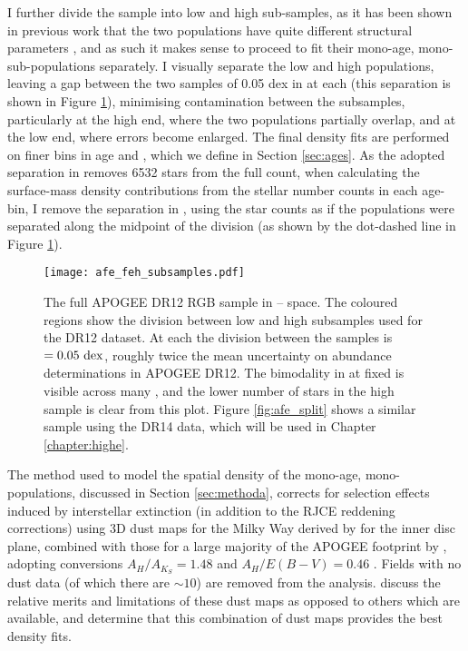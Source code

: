 I further divide the sample into low and high \afe{} sub-samples, as it has been shown in previous work that the two populations have quite different structural parameters \citep{2016ApJ...823...30B}, and as such it makes sense to proceed to fit their mono-age, mono-\feh{} sub-populations separately. I visually separate the low and high \afe{} populations, leaving a gap between the two samples of 0.05 dex in \afe{} at each \feh{} (this separation is shown in Figure \ref{fig:afe_feh}), minimising contamination between the subsamples, particularly at the high \feh{} end, where the two populations partially overlap, and at the low \feh{} end, where \afe{} errors become enlarged. The final density fits are performed on finer bins in age and \feh{}, which we define in Section \ref{sec:ages}. As the adopted separation in \afe{} removes 6532 stars from the full count, when calculating the surface-mass density contributions from the stellar number counts in each age-\feh{} bin, I remove the separation in \afe{}, using the star counts as if the populations were separated along the midpoint of the division (as shown by the dot-dashed line in Figure \ref{fig:afe_feh}). 

 \begin{figure}
  \centering
 	\texttt{[image: afe\_feh\_subsamples.pdf]}
    \caption[\afe{}--\feh{} for the APOGEE DR12 sample, demonstrating the division used to divide between high and low \afe{} populations in Chapter \ref{chapter:apogeestruc}]{The full APOGEE DR12 RGB sample in \afe{}--\feh{} space. The coloured regions show the division between low and high \afe{} subsamples used for the DR12 dataset. At each \feh{} the division between the samples is \afe{} $= 0.05 \ \rm{dex}$, roughly twice the mean uncertainty on \afe{} abundance determinations in APOGEE DR12. The bimodality in \afe{} at fixed \feh{} is visible across many \feh{}, and the lower number of stars in the high \afe{} sample is clear from this plot. Figure \ref{fig:afe_split} shows a similar sample using the DR14 data, which will be used in Chapter \ref{chapter:highe}.}
 \label{fig:afe_feh}
\end{figure}


The method used to model the spatial density of the mono-age, mono-\feh{} populations, discussed in Section \ref{sec:methoda}, corrects for selection effects induced by interstellar extinction (in addition to the RJCE reddening corrections) using 3D dust maps for the Milky Way derived by \citet{2006A&A...453..635M} for the inner disc plane, combined with those for a large majority of the APOGEE footprint by \citep{2015ApJ...810...25G}, adopting conversions $A_H/A_{K_S}=1.48$ and $A_H/E(B-V) = 0.46$ \citep{2011ApJ...737..103S,2013MNRAS.430.2188Y}.  Fields with no dust data (of which there are $\sim 10$) are removed from the analysis. \citet{2016ApJ...823...30B} discuss the relative merits and limitations of these dust maps as opposed to others which are available, and determine that this combination of dust maps provides the best density fits.


